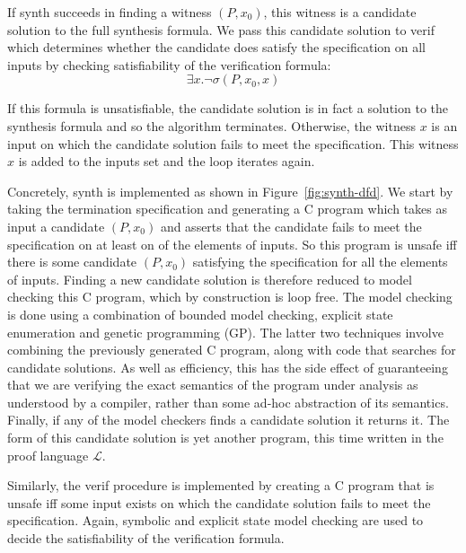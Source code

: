 If {\sc synth} succeeds in finding a witness $(P, x_0)$, this witness is a candidate solution to the full
synthesis formula.  We pass this candidate solution to {\sc verif} which determines whether the candidate
does satisfy the specification on all inputs by checking satisfiability of the verification formula:
\[
 \exists x . \lnot \sigma(P, x_0, x)
\]

If this formula is unsatisfiable, the candidate solution is in fact a solution to the synthesis formula
and so the algorithm terminates.  Otherwise, the witness $x$ is an input on which the candidate solution fails
to meet the specification.  This witness $x$ is added to the {\sc inputs} set and the loop iterates again.

Concretely, {\sc synth} is implemented as shown in Figure~\ref{fig:synth-dfd}.  We start by taking the termination
specification and generating a C program which takes as input a candidate $(P, x_0)$ and asserts that the candidate
fails to meet the specification on at least on of the elements of {\sc inputs}.  So this program is unsafe iff there
is some candidate $(P, x_0)$ satisfying the specification for all the elements of {\sc inputs}.  Finding a new
candidate solution is therefore reduced to model checking this C program, which by construction is loop free.
The model checking is done using a combination of bounded model checking, explicit state enumeration and
genetic programming (GP).  The latter two techniques involve combining the previously generated C program,
along with code that searches for candidate solutions.  As well as efficiency, this has the side effect of
guaranteeing that we are verifying the exact semantics of the program under analysis as understood by a
compiler, rather than some ad-hoc abstraction of its semantics.  Finally, if any of the model checkers
finds a candidate solution it returns it.  The form of this candidate solution is yet another program,
this time written in the proof language $\mathcal{L}$.

Similarly, the {\sc verif} procedure is implemented by creating a C program that is unsafe iff
some input exists on which the candidate solution fails to meet the specification.  Again, symbolic
and explicit state model checking are used to decide the satisfiability of the verification formula.









